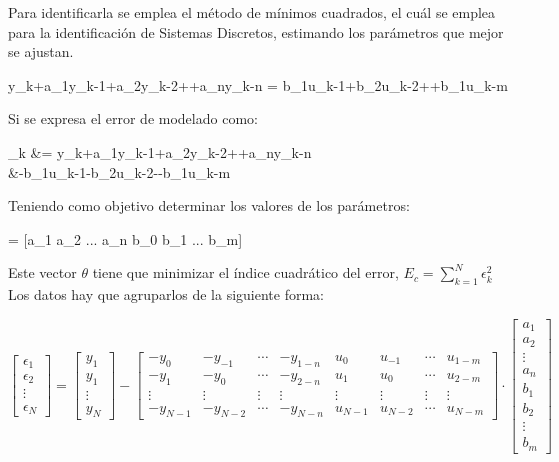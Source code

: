 \documentclass[a4paper, fontsize=11pt]{scrartcl} %
\numberwithin{equation}{section} %
\numberwithin{figure}{section} %
\numberwithin{table}{section} %
\newenvironment{myalign}{\par\nobreak\large\noindent\align}{\endalign} %
\begin{document}
	Para identificarla se emplea el método de mínimos cuadrados, el cuál se emplea para la identificación de Sistemas Discretos, estimando los parámetros que mejor se ajustan.
	
	\begin{myalign}		
		y_k+a_1y_{k-1}+a_2y_{k-2}+\cdots+a_ny_{k-n} = b_1u_{k-1}+b_2u_{k-2}+\cdots+b_1u_{k-m}
	\end{myalign}
	
	Si se expresa el error de modelado como:
	
	\begin{myalign}
		\begin{split}
		\epsilon_k &= y_k+a_1y_{k-1}+a_2y_{k-2}+\cdots+a_ny_{k-n}\\
				   &-b_1u_{k-1}-b_2u_{k-2}-\cdots-b_1u_{k-m}
		\end{split}
	\end{myalign}
	
	Teniendo como objetivo determinar los valores de los parámetros:
	
	\begin{myalign}
		\theta = [a_1 a_2 ... a_n b_0 b_1 ... b_m]
	\end{myalign}
	
	Este vector $\theta$ tiene que minimizar el índice cuadrático del error,  $E_c=\sum_{k=1}^{N}\epsilon_k^2$\\
	
	Los datos hay que agruparlos de la siguiente forma:
	
	
	\[ \left[ \begin{array}{c}
	\epsilon_1 \\
	\epsilon_2 \\
	\vdots	   \\
	\epsilon_N 
	\end{array} \right] = \left[ \begin{array}{c}
	y_{1} \\
	y_{1} \\
	\vdots \\
	y_{N} 
	\end{array} \right] - \left[ \begin{array}{cccccccc}
	-y_{0} & -y_{-1} & \cdots & -y_{1-n} & u_0 & u_{-1} & \cdots & u_{1-m} \\
	-y_{1} & -y_{0} & \cdots & -y_{2-n} & u_1 & u_{0} & \cdots & u_{2-m} \\
	\vdots & \vdots & \vdots & \vdots & \vdots & \vdots & \vdots & \vdots \\
	-y_{N-1} & -y_{N-2} & \cdots & -y_{N-n} & u_{N-1} & u_{N-2} & \cdots & u_{N-m} 
	\end{array} \right] \cdot \left[ \begin{array}{c}
	a_1 \\
	a_2 \\
	\vdots \\
	a_n \\
	b_1 \\
	b_2 \\
	\vdots \\
	b_m 
	\end{array} \right]\] 
	
\end{document}
